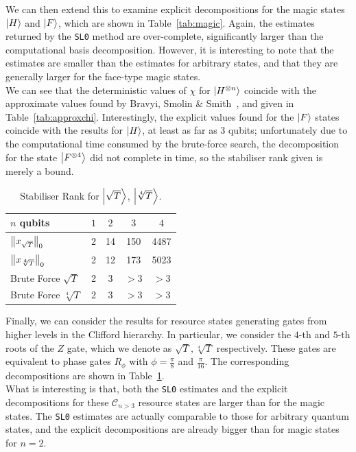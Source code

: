 \documentclass{standalone}
\begin{document}
We can then extend this to examine explicit decompositions for the magic states $\ket{H}$ and $\ket{F}$, which are shown in Table~\ref{tab:magic}. Again, the estimates returned by the \texttt{SL0} method are over-complete, significantly larger than the computational basis decomposition. However, it is interesting to note that the estimates are smaller than the estimates for arbitrary states, and that they are generally larger for the face-type magic states.\\
We can see that the deterministic values of $\chi$ for $\ket{H^{\otimes n}}$ coincide with the approximate values found by Bravyi, Smolin \& Smith~\cite{Bravyi2015}, and given in Table~\ref{tab:approxchi}. Interestingly, the explicit values found for the $\ket{F}$ states coincide with the results for $\ket{H}$, at least as far as $3$ qubits; unfortunately due to the computational time consumed by the brute-force search, the decomposition for the state $\ket{F^{\otimes 4}}$ did not complete in time, so the stabiliser rank given is merely a bound. 
\par

\begin{table}[!h]
\centering
\caption{Stabiliser Rank for $\ket{\sqrt{T}}$, $\ket{\sqrt[4]{T}}$.} \label{tab:highercliff}
\begin{tabular}{||l|c|c|c|c||}
\hline
$n$ qubits & $1$ & $2$ & $3$ & $4$ \\ \hline
$\norm{x_{\sqrt{T}}}_{0}$ & 2 & 14 & 150 & 4487\\ \hline
$\norm{x_{\sqrt[4]{T}}}_{0}$ & 2 & 12 & 173 & 5023\\ \hline
Brute Force $\sqrt{T}$ & 2 & 3  & $>3$ & $>3$\\ \hline
Brute Force $\sqrt[4]{T}$ & 2 & 3  & $>3$ & $>3$\\ \hline
\end{tabular}
\end{table}
Finally, we can consider the results for resource states generating gates from higher levels in the Clifford hierarchy. In particular, we consider the $4$-th and $5$-th roots of the $Z$ gate, which we denote as $\sqrt{T}, \sqrt[4]{T}$ respectively. These gates are equivalent to phase gates $R_{\phi}$ with $\phi=\frac{\pi}{8}$ and $\frac{\pi}{16}$. The corresponding decompositions are shown in Table~\ref{tab:highercliff}. \\
What is interesting is that, both the \texttt{SL0} estimates and the explicit decompositions for these $\mathcal{C}_{n>3}$ resource states are larger than for the magic states. The \texttt{SL0} estimates are actually comparable to those for arbitrary quantum states, and the explicit decompositions are already bigger than for magic states for $n=2$.
\ifstandalone

\fi
\end{document}
